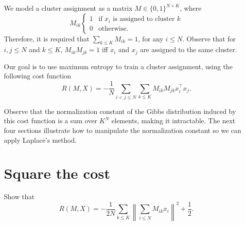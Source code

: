 We model a cluster assignment as a matrix $M \in \{0, 1\}^{N \times K}$, where
%
\begin{equation}
M_{ik} \begin{cases}
1 & \text{if $x_i$ is assigned to cluster $k$}\\
0 & \text{otherwise}.
\end{cases}
\end{equation}
%
Therefore, it is required that $\sum_{k \leq K} M_{ik} = 1$, for any $i \leq N$. Observe that for $i, j \leq N$ and $k \leq K$, $M_{ik}M_{jk} = 1$ iff $x_i$ and $x_j$ are assigned to the same cluster.

Our goal is to use maximum entropy to train a cluster assignment, using the following cost function
%
\begin{equation}
R(M, X) = -\frac{1}{N}\sum_{i < j \leq N} \sum_{k \leq K} M_{ik}M_{jk}x_i^\top x_j.
\end{equation}
%

Observe that the normalization constant of the Gibbs distribution induced by this cost function is a sum over $K^N$ elements, making it intractable. The next four sections illustrate how to manipulate the normalization constant so we can apply Laplace's method.

%

\section{Square the cost}
\label{sec:cost_function_la}

\begin{exercise}
Show that
%
\begin{equation}
R(M, X) = -\frac{1}{2N}\sum_{k \leq K}\left\|\sum_{i \leq N} M_{ik}x_i\right\|^2 + \frac{1}{2}.
\end{equation}
\label{ex:cost_fun_quad}
\end{exercise}

